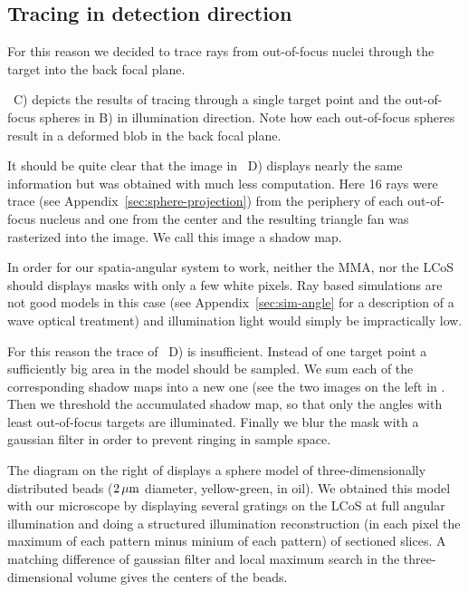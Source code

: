 \subsection{Tracing in detection direction}
For this reason we decided to trace rays from out-of-focus nuclei
through the target into the back focal plane.

~C) depicts the results of tracing
through a single target point and the out-of-focus spheres in B) in
illumination direction. Note how each out-of-focus spheres result in a
deformed blob in the back focal plane. 

It should be quite clear that the image in
~D) displays nearly the same information
but was obtained with much less computation.  Here 16 rays were trace
(see Appendix~\ref{sec:sphere-projection}) from the periphery of each
out-of-focus nucleus and one from the center and the resulting
triangle fan was rasterized into the image. We call this image a
shadow map.


In order for our spatia-angular system to work, neither the MMA, nor
the LCoS should displays masks with only a few white pixels. Ray based
simulations are not good models in this case (see
Appendix~\ref{sec:sim-angle} for a description of a wave optical
treatment) and illumination light would simply be impractically low.

For this reason the trace of ~D) is
insufficient. Instead of one target point a sufficiently big area in
the model should be sampled. We sum each of the corresponding shadow
maps into a new one (see the two images on the left in
. Then we threshold the
accumulated shadow map, so that only the angles with least
out-of-focus targets are illuminated. Finally we blur the mask with a
gaussian filter in order to prevent ringing in sample space.

The diagram on the right of 
displays a sphere model of three-dimensionally distributed beads
($\unit[2]{\mu m}$ diameter, yellow-green, in oil). We obtained this
model with our microscope by displaying several gratings on the LCoS
at full angular illumination and doing a structured illumination
reconstruction (in each pixel the maximum of each pattern minus minium
of each pattern) of sectioned slices. A matching difference of
gaussian filter and local maximum search in the three-dimensional
volume gives the centers of the beads.

